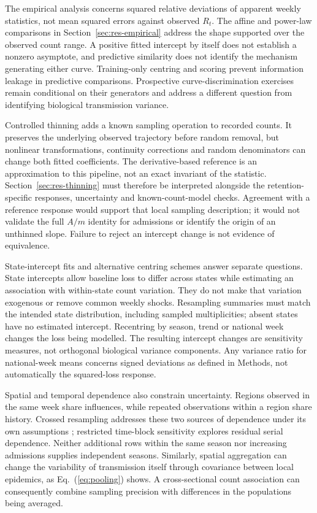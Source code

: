 The empirical analysis concerns squared relative deviations of apparent weekly statistics, not mean squared errors against observed $R_t$. The affine and power-law comparisons in Section~\ref{sec:res-empirical} address the shape supported over the observed count range. A positive fitted intercept by itself does not establish a nonzero asymptote, and predictive similarity does not identify the mechanism generating either curve. Training-only centring and scoring prevent information leakage in predictive comparisons. Prospective curve-discrimination exercises remain conditional on their generators and address a different question from identifying biological transmission variance.

Controlled thinning adds a known sampling operation to recorded counts. It preserves the underlying observed trajectory before random removal, but nonlinear transformations, continuity corrections and random denominators can change both fitted coefficients. The derivative-based reference is an approximation to this pipeline, not an exact invariant of the statistic. Section~\ref{sec:res-thinning} must therefore be interpreted alongside the retention-specific responses, uncertainty and known-count-model checks. Agreement with a reference response would support that local sampling description; it would not validate the full $A/m$ identity for admissions or identify the origin of an unthinned slope. Failure to reject an intercept change is not evidence of equivalence.

State-intercept fits and alternative centring schemes answer separate questions. State intercepts allow baseline loss to differ across states while estimating an association with within-state count variation. They do not make that variation exogenous or remove common weekly shocks. Resampling summaries must match the intended state distribution, including sampled multiplicities; absent states have no estimated intercept. Recentring by season, trend or national week changes the loss being modelled. The resulting intercept changes are sensitivity measures, not orthogonal biological variance components. Any variance ratio for national-week means concerns signed deviations as defined in Methods, not automatically the squared-loss response.

Spatial and temporal dependence also constrain uncertainty. Regions observed in the same week share influences, while repeated observations within a region share history. Crossed resampling addresses these two sources of dependence under its own assumptions \citep{owen2007pigeonhole, cameron2011robust}; restricted time-block sensitivity explores residual serial dependence. Neither additional rows within the same season nor increasing admissions supplies independent seasons. Similarly, spatial aggregation can change the variability of transmission itself through covariance between local epidemics, as Eq.~(\ref{eq:pooling}) shows. A cross-sectional count association can consequently combine sampling precision with differences in the populations being averaged.

